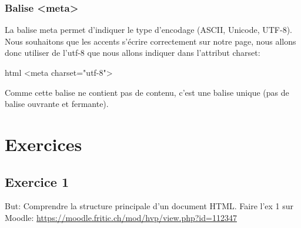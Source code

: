 \documentclass[a4paper,11pt]{article}
\begin{document}
\subsubsection{Balise <meta>}
La balise meta permet d'indiquer le type d'encodage (ASCII, Unicode, UTF-8). Nous souhaitons que les accents s'écrire correctement sur notre page, nous allons donc utiliser de l'utf-8 que nous allons indiquer dans l'attribut charset:
\begin{code}{html}
<meta charset="utf-8">
\end{code}
Comme cette balise ne contient pas de contenu, c'est une balise unique (pas de balise ouvrante et fermante).

\section{Exercices}
\subsection{Exercice 1}
But: Comprendre la structure principale d'un document HTML.
Faire l'ex 1 sur Moodle: \url{https://moodle.fritic.ch/mod/hvp/view.php?id=112347}
\end{document}
